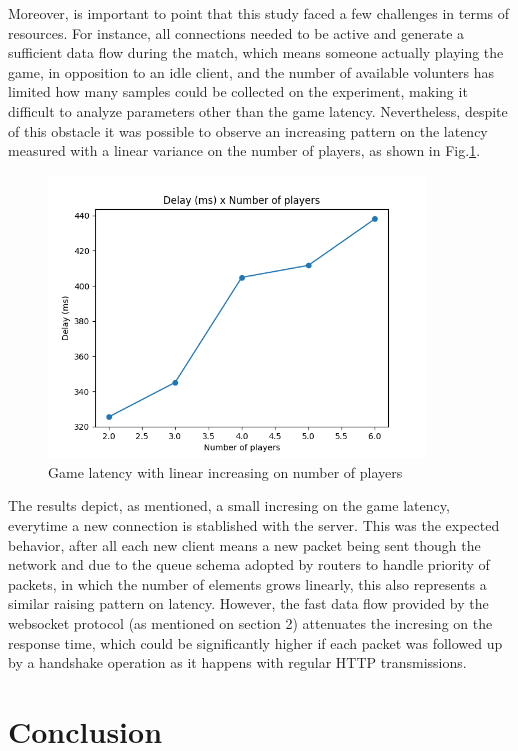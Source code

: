 \documentclass[english]{sbrt}
\begin{document}
Moreover, is important to point that this study faced a few challenges in terms of resources. For instance, all connections needed to be active and generate a sufficient data flow during the match, which means someone actually playing the game, in opposition to an idle client, and the number of available volunters has limited how many samples could be collected on the experiment, making it difficult to analyze parameters other than the game latency. Nevertheless, despite of this obstacle it was possible to observe an increasing pattern on the latency measured with a linear variance on the number of players, as shown in Fig.\ref{latency}.

\begin{figure}[H]
  \centering
  \includegraphics[width=10cm]{graphs/graph.png}
  \caption{Game latency with linear increasing on number of players}
  \label{latency}
\end{figure}

The results depict, as mentioned, a small incresing on the game latency, everytime a new connection is stablished with the server. This was the expected behavior, after all each new client means a new packet being sent though the network and due to the queue schema adopted by routers to handle priority of packets, in which the number of elements grows linearly, this also represents a similar raising pattern on latency. However, the fast data flow provided by the websocket protocol (as mentioned on section 2) attenuates the incresing on the response time, which could be significantly higher if each packet was followed up by a handshake operation as it happens with regular HTTP transmissions.

\section{\textbf{Conclusion}}


\cite{chen2011framework}



\end{document}
